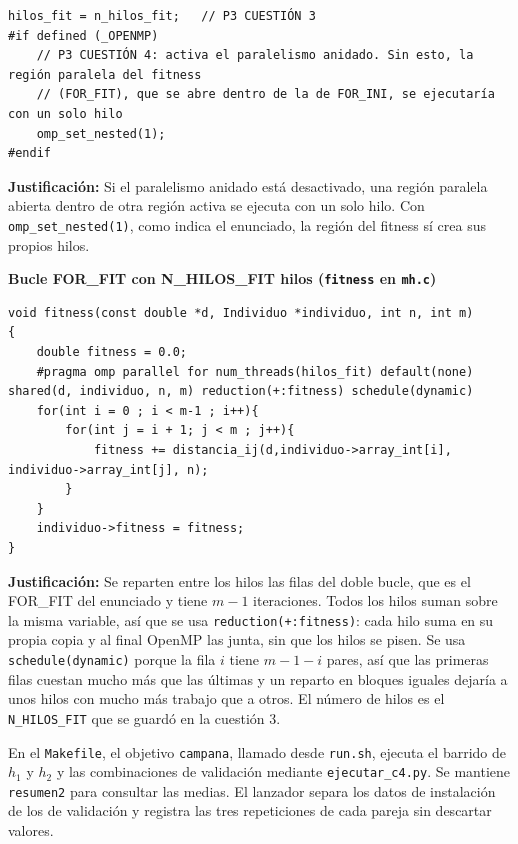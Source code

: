 \documentclass[12pt]{article}
\begin{document}
\begin{enumerate}
\begin{lstlisting}[style=EstiloC]
    hilos_fit = n_hilos_fit;   // P3 CUESTIÓN 3
#if defined (_OPENMP)
    // P3 CUESTIÓN 4: activa el paralelismo anidado. Sin esto, la región paralela del fitness
    // (FOR_FIT), que se abre dentro de la de FOR_INI, se ejecutaría con un solo hilo
    omp_set_nested(1);
#endif
\end{lstlisting}

\textbf{Justificación:} Si el paralelismo anidado está desactivado, una región paralela abierta dentro de otra región activa se ejecuta con un solo hilo. Con \texttt{omp\_set\_nested(1)}, como indica el enunciado, la región del fitness sí crea sus propios hilos.

\vspace{0.5cm}

\medskip
\noindent\textbf{Bucle FOR\_FIT con N\_HILOS\_FIT hilos (\texttt{fitness} en \texttt{mh.c})}\par
\smallskip

\begin{lstlisting}[style=EstiloC]
void fitness(const double *d, Individuo *individuo, int n, int m)
{
    double fitness = 0.0;
    #pragma omp parallel for num_threads(hilos_fit) default(none) shared(d, individuo, n, m) reduction(+:fitness) schedule(dynamic)
    for(int i = 0 ; i < m-1 ; i++){
        for(int j = i + 1; j < m ; j++){
            fitness += distancia_ij(d,individuo->array_int[i], individuo->array_int[j], n);
        }
    }
    individuo->fitness = fitness;
}
\end{lstlisting}

\textbf{Justificación:} Se reparten entre los hilos las filas del doble bucle, que es el FOR\_FIT del enunciado y tiene $m-1$ iteraciones. Todos los hilos suman sobre la misma variable, así que se usa \texttt{reduction(+:fitness)}: cada hilo suma en su propia copia y al final OpenMP las junta, sin que los hilos se pisen. Se usa \texttt{schedule(dynamic)} porque la fila $i$ tiene $m-1-i$ pares, así que las primeras filas cuestan mucho más que las últimas y un reparto en bloques iguales dejaría a unos hilos con mucho más trabajo que a otros. El número de hilos es el \texttt{N\_HILOS\_FIT} que se guardó en la cuestión 3.

\vspace{0.5cm}

En el \texttt{Makefile}, el objetivo \texttt{campana}, llamado desde \texttt{run.sh}, ejecuta el barrido de $h_1$ y $h_2$ y las combinaciones de validación mediante \texttt{ejecutar\_c4.py}. Se mantiene \texttt{resumen2} para consultar las medias. El lanzador separa los datos de instalación de los de validación y registra las tres repeticiones de cada pareja sin descartar valores.


\end{enumerate}
\end{document}
